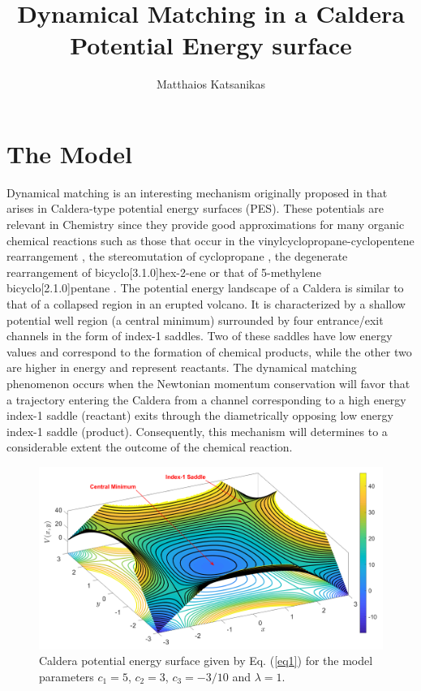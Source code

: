 \documentclass[a4paper,10pt]{article}
\title{Dynamical Matching in a Caldera Potential Energy surface}
\author{Matthaios Katsanikas}
\begin{document}
                           
\maketitle

\section{The Model} 

Dynamical matching is an interesting mechanism originally proposed in \cite{carpenter1985,carpenter1995} that arises in Caldera-type potential energy surfaces (PES). These potentials are relevant in Chemistry since they provide good approximations for many organic chemical reactions such as those that occur in the vinylcyclopropane-cyclopentene rearrangement \cite{baldwin2003,gold1988}, the stereomutation of cyclopropane \cite{doubleday1997}, the degenerate rearrangement of bicyclo[3.1.0]hex-2-ene \cite{doubleday1999,doubleday2006} or that of 5-methylene\\bicyclo[2.1.0]pentane \cite{reyes2002}. The potential energy landscape of a Caldera is similar to that of a collapsed region in an erupted volcano. It is characterized by a shallow potential well region (a central minimum) surrounded by four entrance/exit channels in the form of index-1 saddles. Two of these saddles have low energy values and correspond to the formation of chemical products, while the other two are higher in energy and represent reactants. The dynamical matching phenomenon occurs when the Newtonian momentum conservation will favor that a trajectory entering the Caldera from a channel corresponding to a high energy index-1 saddle (reactant) exits through the diametrically opposing low energy index-1 saddle (product). Consequently, this mechanism will determines to a considerable extent the outcome of the chemical reaction.

\begin{figure}[htbp]
	\centering
	\includegraphics[scale=0.25]{caldera_pes_lambda_1.png}
	\caption{Caldera potential energy surface given by Eq. (\ref{eq1}) for the model parameters $c_1 = 5$, $c_2 = 3$, $c_3 = -3/10$ and $\lambda = 1$.}
	\label{caldera_pes}
\end{figure}




\end{document}
